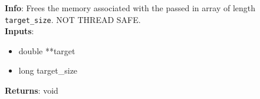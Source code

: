 \textbf{Info}: Frees the memory associated with the passed in array of length
\texttt{target\_size}. NOT THREAD SAFE. \\

\noindent \textbf{Inputs}:
\begin{itemize}
\item{double **target}
\item{long target\_size}
\end{itemize}

\noindent \textbf{Returns}: void
